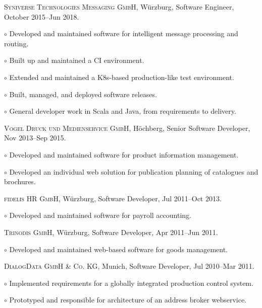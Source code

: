\documentclass[letterpaper]{article}
\renewenvironment{itemize}{
  \begin{list}{}{
    \setlength{\leftmargin}{1.5em}
  }
}{
  \end{list}
}
\newenvironment{no-indent-itemize}{
  \begin{list}{}{
    \setlength{\leftmargin}{0em}
  }
}{
  \end{list}
}
\def\bullet{$\circ$\xspace}
\begin{document}
\begin{no-indent-itemize}
\begin{itemize}
  \end{itemize}
  \item \textsc{Syniverse Technologies Messaging GmbH}, Würzburg, Software Engineer, October 2015--Jun 2018.
  \begin{itemize}
    \item\bullet Developed and maintained software for intelligent message processing and routing.
    \item\bullet Built up and maintained a CI environment.
    \item\bullet Extended and maintained a K8s-based production-like test environment.
    \item\bullet Built, managed, and deployed software releases.
    \item\bullet General developer work in Scala and Java, from requirements to delivery.
  \end{itemize}
  \item \textsc{Vogel Druck und Medienservice GmbH}, Höchberg, Senior Software Developer, Nov 2013--Sep 2015.
  \begin{itemize}
    \item\bullet Developed and maintained software for product information management.
    \item\bullet Developed an individual web solution for publication planning of catalogues and brochures.
  \end{itemize}
  \item \textsc{fidelis HR GmbH}, Würzburg, Software Developer, Jul 2011--Oct 2013.
  \begin{itemize}
    \item\bullet Developed and maintained software for payroll accounting.
  \end{itemize}
  \item \textsc{Trinodis GmbH}, Würzburg, Software Developer, Apr 2011--Jun 2011.
  \begin{itemize}
    \item\bullet Developed and maintained web-based software for goods management.
  \end{itemize}
  \item \textsc{DialogData GmbH \& Co. KG}, Munich, Software Developer, Jul 2010--Mar 2011.
  \begin{itemize}
	\item\bullet Implemented requirements for a globally integrated production control system.
	\item\bullet Prototyped and responsible for architecture of an address broker webservice.

\end{itemize}
\end{no-indent-itemize}
\end{document}
